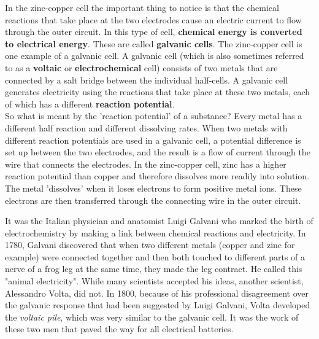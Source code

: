In the zinc-copper cell the important thing to notice is that the chemical reactions that take place at the two electrodes cause an electric current to flow through the outer circuit. In this type of cell, \textbf{chemical energy is converted to electrical energy}. These are called \textbf{galvanic cells}. The zinc-copper cell is one example of a galvanic cell. A galvanic cell (which is also sometimes referred to as a \textbf{voltaic} or \textbf{electrochemical} cell) consists of two metals that are connected by a salt bridge between the individual half-cells. A galvanic cell generates electricity using the reactions that take place at these two metals, each of which has a different \textbf{reaction potential}.\\

So what is meant by the 'reaction potential' of a substance? Every metal has a different half reaction and different dissolving rates. When two metals with different reaction potentials are used in a galvanic cell, a potential difference is set up between the two electrodes, and the result is a flow of current through the wire that connects the electrodes. In the zinc-copper cell, zinc has a higher reaction potential than copper and therefore dissolves more readily into solution. The metal 'dissolves' when it loses electrons to form positive metal ions. These electrons are then transferred through the connecting wire in the outer circuit. 


\begin{IFact}{It was the Italian physician and anatomist Luigi Galvani who marked the birth of electrochemistry by making a link between chemical reactions and electricity. In 1780, Galvani discovered that when two different metals (copper and zinc for example) were connected together and then both touched to different parts of a nerve of a frog leg at the same time, they made the leg contract. He called this "animal electricity". While many scientists accepted his ideas, another scientist, Alessandro Volta, did not. In 1800, because of his professional disagreement over the galvanic response that had been suggested by Luigi Galvani, Volta developed the \textit{voltaic pile}, which was very similar to the galvanic cell. It was the work of these two men that paved the way for all electrical batteries.}
\end{IFact}

